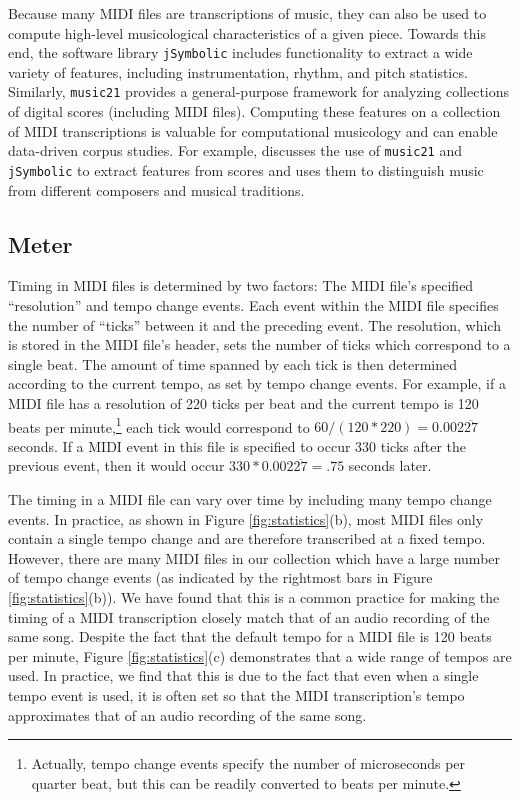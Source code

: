 \documentclass{article}
\begin{document}
Because many MIDI files are transcriptions of music, they can also be used to compute high-level musicological characteristics of a given piece.
Towards this end, the software library \texttt{jSymbolic} \cite{mckay2006jsymbolic} includes functionality to extract a wide variety of features, including instrumentation, rhythm, and pitch statistics.
Similarly, \texttt{music21} \cite{cuthbert2010music21} provides a general-purpose framework for analyzing collections of digital scores (including MIDI files).
Computing these features on a collection of MIDI transcriptions is valuable for computational musicology and can enable data-driven corpus studies.
For example, \cite{cuthbert2011feature} discusses the use of \texttt{music21} and \texttt{jSymbolic} to extract features from scores and uses them to distinguish music from different composers and musical traditions.

\subsection{Meter}

Timing in MIDI files is determined by two factors: The MIDI file's specified ``resolution'' and tempo change events.
Each event within the MIDI file specifies the number of ``ticks'' between it and the preceding event.
The resolution, which is stored in the MIDI file's header, sets the number of ticks which correspond to a single beat.
The amount of time spanned by each tick is then determined according to the current tempo, as set by tempo change events.
For example, if a MIDI file has a resolution of 220 ticks per beat and the current tempo is 120 beats per minute,\footnote{Actually, tempo change events specify the number of microseconds per quarter beat, but this can be readily converted to beats per minute.} each tick would correspond to $60/(120*220) = 0.002\overline{27}$ seconds.
If a MIDI event in this file is specified to occur 330 ticks after the previous event, then it would occur $330*0.002\overline{27} = .75$ seconds later.

The timing in a MIDI file can vary over time by including many tempo change events.
In practice, as shown in Figure \ref{fig:statistics}(b), most MIDI files only contain a single tempo change and are therefore transcribed at a fixed tempo.
However, there are many MIDI files in our collection which have a large number of tempo change events (as indicated by the rightmost bars in Figure \ref{fig:statistics}(b)).
We have found that this is a common practice for making the timing of a MIDI transcription closely match that of an audio recording of the same song.
Despite the fact that the default tempo for a MIDI file is 120 beats per minute, Figure \ref{fig:statistics}(c) demonstrates that a wide range of tempos are used.
In practice, we find that this is due to the fact that even when a single tempo event is used, it is often set so that the MIDI transcription's tempo approximates that of an audio recording of the same song.
\end{document}
